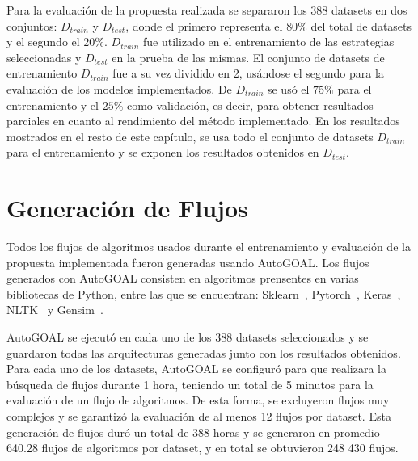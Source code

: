  
 Para la evaluación de la propuesta realizada se separaron los 388 datasets en dos conjuntos: $D_{train}$ y $D_{test}$, donde el primero representa el $80\%$ del total de datasets y el segundo el $20\%$. $D_{train}$ fue utilizado en el entrenamiento de las estrategias seleccionadas y $D_{test}$ en la prueba de las mismas. El conjunto de datasets de entrenamiento $D_{train}$ fue a su vez dividido en 2, usándose el segundo para la evaluación de los modelos implementados. De $D_{train}$ se usó el $75\%$ para el entrenamiento y el $25\%$ como validación, es decir, para obtener resultados parciales en cuanto al rendimiento del método implementado. En los resultados mostrados en el resto de este capítulo, se usa todo el conjunto de datasets $D_{train}$ para el entrenamiento y se exponen los resultados obtenidos en $D_{test}$.

 
 \section{Generación de Flujos}\label{sec:flujos}
 

Todos los flujos de algoritmos usados durante el entrenamiento y evaluación de la propuesta implementada fueron generadas usando AutoGOAL. Los flujos generados con AutoGOAL consisten en algoritmos prensentes en varias bibliotecas de Python, entre las que se encuentran: Sklearn~\cite{scikit-learn}, Pytorch~\cite{paszke2019pytorch}, Keras~\cite{chollet2015keras}, NLTK~\cite{bird2009natural} y Gensim~\cite{khosrovian2008gensim}.

AutoGOAL se ejecutó en cada uno de los 388 datasets seleccionados y se guardaron todas las arquitecturas generadas junto con los resultados obtenidos. Para cada uno de los datasets, AutoGOAL se configuró para que realizara la búsqueda de flujos durante 1 hora, teniendo un total de 5 minutos para la evaluación de un flujo de algoritmos. De esta forma, se excluyeron flujos muy complejos y se garantizó la evaluación de al menos 12 flujos por dataset. Esta generación de flujos duró un total de 388 horas y se generaron en promedio 640.28 flujos de algoritmos por dataset, y en total se obtuvieron 248 430  flujos. 

